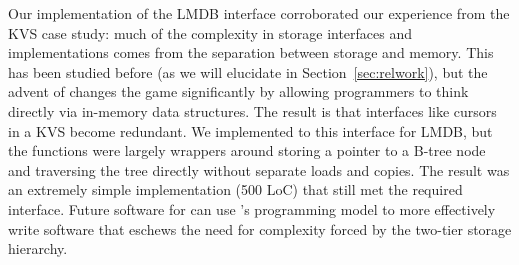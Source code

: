 {    Our implementation of the LMDB interface
    corroborated our experience from the KVS case study: much of the complexity in storage interfaces
    and implementations comes from the separation between storage and memory. This has been
    studied before (as we will elucidate in Section~\ref{sec:relwork}), but the advent of \NVM changes the game
    significantly by allowing programmers to think directly via in-memory data structures. The result is
    that interfaces like cursors in a KVS become redundant. We implemented to this interface
    for LMDB, but the functions were largely wrappers around storing a pointer
    to a B-tree node and traversing the tree directly without separate loads and copies. The result was
    an extremely simple implementation (500 LoC) that still met the required interface. Future software
    for \NVM can use \Twizzler's programming model to more effectively write software
    that eschews the need for complexity forced by the two-tier storage hierarchy.

}

